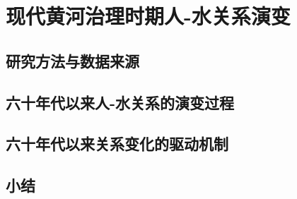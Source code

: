 \chapter{现代黄河治理时期人-水关系演变}\label{cha:4}


\section{研究方法与数据来源}\label{ch4:methods}


\section{六十年代以来人-水关系的演变过程}\label{ch4:process}


\section{六十年代以来关系变化的驱动机制}\label{ch4:mechanism}




\section{小结}\label{ch4:summary}

